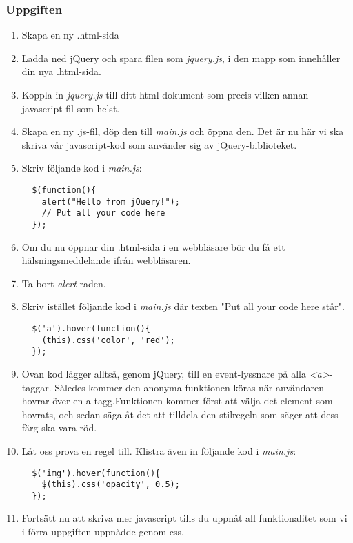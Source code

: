 \documentclass{article}
\begin{document}
    \subsubsection*{Uppgiften}
      \begin{enumerate}
        \item Skapa en ny .html-sida
        \item Ladda ned \href{http://code.jquery.com/jquery-1.10.2.min.js}{jQuery} och spara filen som \emph{jquery.js}, i den mapp som innehåller din nya .html-sida.
        \item Koppla in \emph{jquery.js} till ditt html-dokument som precis vilken annan javascript-fil som helst.
        \item Skapa en ny .js-fil, döp den till \emph{main.js} och öppna den. Det är nu här vi ska skriva vår javascript-kod som använder sig av jQuery-biblioteket.
        \item Skriv följande kod i \emph{main.js}:
          \lstset{language=JavaScript}
          \begin{lstlisting}
  $(function(){
    alert("Hello from jQuery!");
    // Put all your code here
  });
          \end{lstlisting}
        \item Om du nu öppnar din .html-sida i en webbläsare bör du få ett hälsningsmeddelande ifrån webbläsaren.
        \item Ta bort \emph{alert}-raden.
        \item Skriv istället följande kod i \emph{main.js} där texten "Put all your code here står".
          \begin{lstlisting}
  $('a').hover(function(){
    (this).css('color', 'red');
  });
          \end{lstlisting}
        \item Ovan kod lägger alltså, genom jQuery, till en event-lyssnare på alla \emph{<a>}-taggar. Således kommer den anonyma funktionen köras när användaren hovrar över en a-tagg.Funktionen kommer först att välja det element som hovrats, och sedan säga åt det att tilldela den stilregeln som säger att dess färg ska vara röd.
        \item Låt oss prova en regel till. Klistra även in följande kod i \emph{main.js}:
        \begin{lstlisting}
  $('img').hover(function(){
    $(this).css('opacity', 0.5);
  });
        \end{lstlisting}
        \item Fortsätt nu att skriva mer javascript tills du uppnåt all funktionalitet som vi i förra uppgiften uppnådde genom css.
      \end{enumerate}








 
\end{document}
